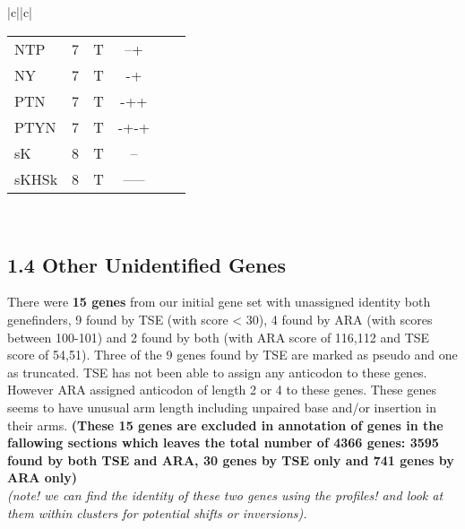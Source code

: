\documentclass[table,
12pt, %
a4paper, %
oneside, %
headinclude,footinclude, %
BCOR5mm, %
]{scrartcl}
\begin{document}
\begin{table}[htbp]
\begin{adjustbox}{width=\textwidth,center}
\begin{tabular}{|c||c|}
\begin{tabular}{l ccccc}
        NTP        & 7   & T           & --+        &       &         \\
        NY         & 7   & T           & -+         &       &         \\
        PTN        & 7   & T           & -++        &       &         \\
        PTYN       & 7   & T           & -+-+       &       &         \\
        \rowcolor{shadecolor}
        sK         & 8   & T           & --         &       &         \\
        sKHSk      & 8   & T           & -----      &       &         \\
      \end{tabular} \\ \hline
    \end{tabular}
    \label{table:pseudo3}
  \end{adjustbox}
\end{table}



\subsection{\textbf{1.4 Other Unidentified Genes}}

There were \textbf{15 genes} from our initial gene set with unassigned identity both genefinders, 9 found by TSE (with score < 30), 4 found by ARA (with scores between 100-101) and 2 found by both (with ARA score of 116,112 and TSE score of 54,51). Three of the 9 genes found by TSE are marked as pseudo and one as truncated. TSE has not been able to assign any anticodon to these genes. However ARA assigned anticodon of length 2 or 4 to these genes. These genes seems to have unusual arm length including unpaired base and/or insertion in their arms.\textbf{ (These 15 genes are excluded in annotation of genes in the fallowing sections which leaves the total number of 4366 genes: 3595 found by both TSE and ARA, 30 genes by TSE only and 741 genes by ARA only)}\\
\emph{(note! we can find the identity of these two genes using the profiles! and look at them within clusters for potential shifts or inversions).}\\
\end{document}
